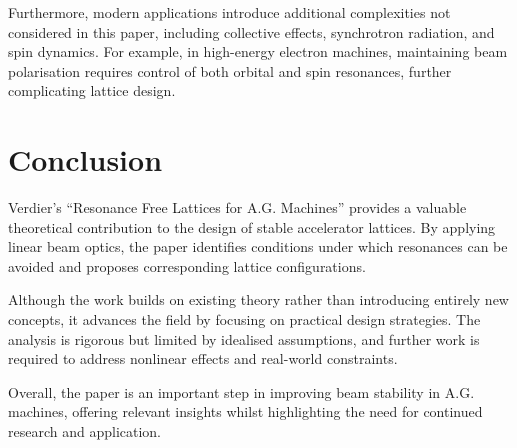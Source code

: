 \documentclass[twocolumn,10pt,a4paper]{article}
\begin{document}
Furthermore, modern applications introduce additional complexities not considered in this paper, including collective effects, synchrotron radiation, and spin dynamics. For example, in high-energy electron machines, maintaining beam polarisation requires control of both orbital and spin resonances, further complicating lattice design.

\section{Conclusion}

Verdier’s ``Resonance Free Lattices for A.G. Machines'' provides a valuable theoretical contribution to the design of stable accelerator lattices. By applying linear beam optics, the paper identifies conditions under which resonances can be avoided and proposes corresponding lattice configurations.

Although the work builds on existing theory rather than introducing entirely new concepts, it advances the field by focusing on practical design strategies. The analysis is rigorous but limited by idealised assumptions, and further work is required to address nonlinear effects and real-world constraints.

Overall, the paper is an important step in improving beam stability in A.G. machines, offering relevant insights whilst highlighting the need for continued research and application.



\end{document}

